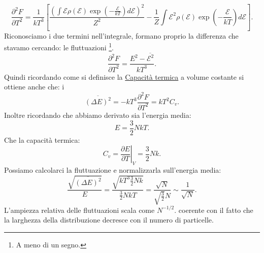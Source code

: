 \[
	\frac{\partial ^2 F}{\partial T^2} = \frac{1}{kT^3} 
	\left[
		\frac{\left( \int \mathcal{E}\rho(\mathcal{E})\exp\left( -\frac{\mathcal{E}}{kT}  \right)d\mathcal{E} \right)^2  }{Z^2}  
		- \frac{1}{Z}\int \mathcal{E}^2\rho\left( \mathcal{E} \right) \exp\left( - \frac{\mathcal{E}}{kT} \right)d\mathcal{E}  
	\right]
.\] 
Riconosciamo i due termini nell'integrale, formano proprio la differenza che stavamo cercando: le fluttuazioni \footnote{A meno di un segno.}.
\[
	\frac{\partial ^2 F}{\partial T^2} = \frac{E^2-\overline{\mathcal{E}^2}}{kT^3}
.\] 
Quindi ricordando come si definisce la \hyperref[eq:capacita-termica]{Capacità termica} a volume costante si ottiene anche che: 
i
\[
	\overline{\left( \Delta E \right) ^2} = -kT^3 \frac{\partial ^2 F}{\partial T^2} = kT^2 C_{v}
.\] 
Inoltre ricordando che abbiamo derivato sia l'energia media:
\[
	E = \frac{3}{2}N kT
.\] 
Che la capacità termica:
\[
	C_{v} = \left.\frac{\partial E}{\partial T} \right|_{V} =  \frac{3}{2}Nk
.\] 
Possiamo calcolarci la fluttuazione e normalizzarla sull'energia media:
\[
	\frac{\sqrt{\overline{\left( \Delta E \right) ^2}} }{E} = \frac{\sqrt{kT^3 \frac{3}{2}Nk} }{\frac{3}{2}NkT} = \frac{\sqrt{N} }{\sqrt{\frac{3}{2}}N}\sim \frac{1}{\sqrt{N} }
.\] 
L'ampiezza relativa delle fluttuazioni scala come $N^{-1 /2 }$. coerente con il fatto che la larghezza della distribuzione decresce con il numero di particelle.\\
